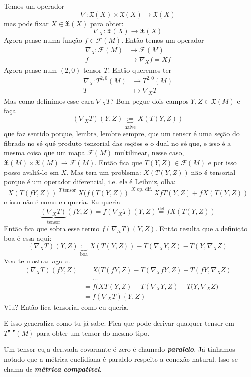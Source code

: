 Temos um operador
\[\nabla:\mathfrak{X}(X) \times \mathfrak{X}(X) \longrightarrow \mathfrak{X}(X)\]
mas pode fixar \(X \in \mathfrak{X}(X)\) para obter:
\[\nabla_X:\mathfrak{X}(X)\longrightarrow \mathfrak{X}(X)\]
Agora pense numa função \(f \in \mathcal{F}(M)\). Então temos um operador
\begin{align*}
	\nabla_X: \mathcal{F}(M) &\longrightarrow \mathcal{F}(M) \\
	f &\longmapsto \nabla_Xf=Xf
\end{align*}
Agora pense num \((2,0)\)-tensor \(T\). Então queremos ter
\begin{align*}
	\nabla_X: T^{2,0}(M) &\longrightarrow T^{2,0}(M) \\
	T &\longmapsto \nabla_X T
\end{align*}
Mas como definimos esse cara \(\nabla_X T\)? Bom pegue dois campos \(Y,Z \in \mathfrak{X}(M)\) e faça
\[(\nabla_X T)(Y,Z)\underbrace{:=}_{\text{naive} }X(T(Y,Z))\]
que faz sentido porque, lembre, lembre sempre, que um tensor é uma seção do fibrado no sé qué produto tensorial das seções e o dual no sé que, e isso é a mesma coisa que um mapa \(\mathcal{F}(M)\) multilinear, nesse caso, \(\mathfrak{X}(M)\times \mathfrak{X}(M) \to \mathcal{F}(M)\). Então fica que \(T(Y,Z) \in \mathcal{F}(M)\) e por isso posso avaliá-lo em \(X\). Mas tem um problema: \(X(T(Y,Z))\) não é tensorial porque é um operador diferencial, i.e. ele é Leibniz, olha:
\[X(T(fY,Z))\overset{T \text{ tensor} }{=}X(f(T(Y,Z))\overset{X \text{ op. dif.} }{=}Xf T(Y,Z)+f X(T(Y,Z))\]
e isso não é como eu queria. Eu queria
\[\underbrace{(\nabla_X T)}_{\text{tensor} }(fY,Z)=f (\nabla_X T)(Y,Z)\overset{\operatorname{def}}{=}fX(T(Y,Z))\]
Então fica que sobra esse termo \(f(\nabla_X T)(Y,Z)\). Então resulta que a definição boa é essa aqui:
\[(\nabla_X T)(Y,Z)\underbrace{:=}_{\text{boa} }X(T(Y,Z))-T(\nabla_XY,Z)-T(Y,\nabla_XZ)\]
Vou te mostrar agora:
\begin{align*}
	(\nabla_XT)(fY,Z)&=X(T(fY,Z)-T(\nabla_XfY,Z)-T(fY,\nabla_XZ)\\
	&=\ldots\\
	&=f\Big(XT(Y,Z)-T(\nabla_XY,Z)-T(Y,\nabla_XZ\Big)\\
	&=f(\nabla_XT)(Y,Z)
\end{align*}
Viu? Então fica tensorial como eu queria.

E isso generaliza como tu já sabe. Fica que pode derivar qualquer tensor em \(T^{\bullet,\bullet}(M)\) para obter um tensor do mesmo tipo.

Um tensor cuja derivada covariante é zero é chamado \textit{\textbf{paralelo}}. Já tínhamos notado que a métrica euclidiana é paralelo respeito a conexão natural. Isso se chama de \textit{\textbf{métrica compatível}}.

